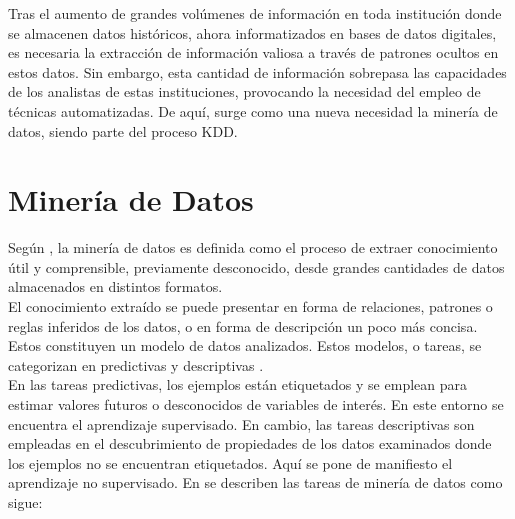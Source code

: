 Tras el aumento de  grandes volúmenes de información en toda institución donde se almacenen datos históricos, ahora informatizados en bases de datos digitales, es necesaria la extracción de información valiosa a través de patrones ocultos en estos datos. Sin embargo, esta cantidad de información sobrepasa las capacidades de los analistas de estas instituciones, provocando la necesidad del empleo de técnicas automatizadas. De aquí, surge como una nueva necesidad la minería de datos, siendo parte del proceso KDD.		

\section{Minería de Datos}
Según \citep{orallo2004}, la minería de datos es definida como el proceso de extraer conocimiento útil y comprensible, previamente desconocido, desde grandes cantidades de datos almacenados en distintos formatos. \\
El conocimiento extraído se puede presentar en forma de relaciones, patrones o reglas inferidos de los datos, o en forma de descripción un poco más concisa. Estos constituyen un modelo de datos analizados. Estos modelos, o tareas, se categorizan en predictivas y descriptivas \citep{orallo2004}. \\
En las tareas predictivas, los ejemplos están etiquetados y se emplean para estimar valores futuros o desconocidos de variables de interés. En este entorno se encuentra el aprendizaje supervisado. En cambio, las tareas descriptivas son empleadas en el descubrimiento de propiedades de los datos examinados donde los ejemplos no se encuentran etiquetados. Aquí se pone de manifiesto el aprendizaje no supervisado. En \citep{orallo2004} se describen las tareas de minería de datos como sigue:
